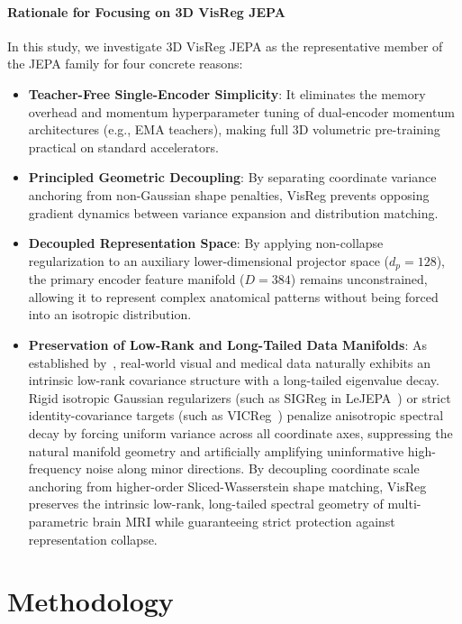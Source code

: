 \documentclass{article}
\begin{document}
\paragraph{Rationale for Focusing on 3D VisReg JEPA}
In this study, we investigate 3D VisReg JEPA as the representative member of the JEPA family for four concrete reasons:
\begin{itemize}
    \item \textbf{Teacher-Free Single-Encoder Simplicity}: It eliminates the memory overhead and momentum hyperparameter tuning of dual-encoder momentum architectures (e.g., EMA teachers), making full 3D volumetric pre-training practical on standard accelerators.
    \item \textbf{Principled Geometric Decoupling}: By separating coordinate variance anchoring from non-Gaussian shape penalties, VisReg prevents opposing gradient dynamics between variance expansion and distribution matching.
    \item \textbf{Decoupled Representation Space}: By applying non-collapse regularization to an auxiliary lower-dimensional projector space ($d_p = 128$), the primary encoder feature manifold ($D = 384$) remains unconstrained, allowing it to represent complex anatomical patterns without being forced into an isotropic distribution.
    \item \textbf{Preservation of Low-Rank and Long-Tailed Data Manifolds}: As established by~\citet{wu2026visreg}, real-world visual and medical data naturally exhibits an intrinsic low-rank covariance structure with a long-tailed eigenvalue decay. Rigid isotropic Gaussian regularizers (such as SIGReg in LeJEPA~\citep{balestriero2025lejepa}) or strict identity-covariance targets (such as VICReg~\citep{bardes2021vicreg}) penalize anisotropic spectral decay by forcing uniform variance across all coordinate axes, suppressing the natural manifold geometry and artificially amplifying uninformative high-frequency noise along minor directions. By decoupling coordinate scale anchoring from higher-order Sliced-Wasserstein shape matching, VisReg preserves the intrinsic low-rank, long-tailed spectral geometry of multi-parametric brain MRI while guaranteeing strict protection against representation collapse.
\end{itemize}


\section{Methodology}
\label{sec:methodology}
\end{document}
